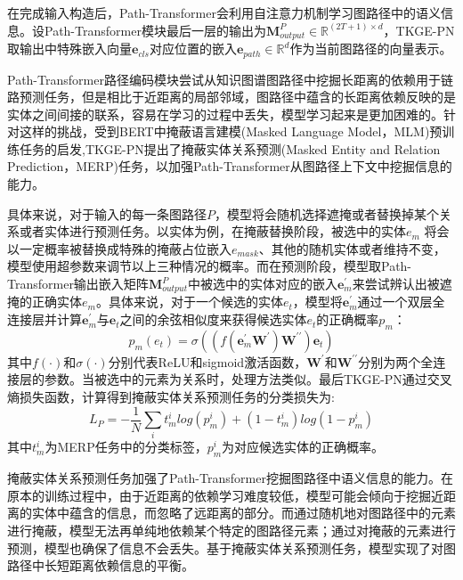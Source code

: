 在完成输入构造后，Path-Transformer会利用自注意力机制学习图路径中的语义信息。设Path-Transformer模块最后一层的输出为$\mathbf{M}_{output}^{P}\in\mathbb{R}^{(2T+1)\times d}$，TKGE-PN取输出中特殊嵌入向量$\boldsymbol{e}_{cls}$对应位置的嵌入$\boldsymbol{e}_{path}\in\mathbb{R}^d$作为当前图路径的向量表示。

Path-Transformer路径编码模块尝试从知识图谱图路径中挖掘长距离的依赖用于链路预测任务，但是相比于近距离的局部邻域，图路径中蕴含的长距离依赖反映的是实体之间间接的联系，容易在学习的过程中丢失，模型学习起来是更加困难的。针对这样的挑战，受到BERT中掩蔽语言建模(Masked Language Model，MLM)预训练任务的启发,TKGE-PN提出了掩蔽实体关系预测(Masked Entity and Relation Prediction，MERP)任务，以加强Path-Transformer从图路径上下文中挖掘信息的能力。

具体来说，对于输入的每一条图路径$P$，模型将会随机选择遮掩或者替换掉某个关系或者实体进行预测任务。以实体为例，在掩蔽替换阶段，被选中的实体$e_m$ 将会以一定概率被替换成特殊的掩蔽占位嵌入$e_{mask}$、其他的随机实体或者维持不变，模型使用超参数来调节以上三种情况的概率。而在预测阶段，模型取Path-Transformer输出嵌入矩阵$\mathbf{M}_{output}^{P}$中被选中的实体对应的嵌入$\boldsymbol{e}_{m}^\prime$来尝试辨认出被遮掩的正确实体$e_m$。具体来说，对于一个候选的实体$e_t$，模型将$\boldsymbol{e}_{m}^\prime$通过一个双层全连接层并计算$\boldsymbol{e}_{m}^\prime$与$\boldsymbol{e}_{t}$之间的余弦相似度来获得候选实体$e_t$的正确概率$p_m$：
\begin{equation}
  p_m(e_t)=\sigma((f(\boldsymbol{e}_m^\prime\mathbf{W}^{\prime})\mathbf{W}^{\prime\prime})\boldsymbol{e}_t)
\end{equation}
其中$f (\cdot)$和$\sigma(\cdot)$分别代表ReLU和sigmoid激活函数，$\mathbf{W}^{\prime}$和$\mathbf{W}^{\prime\prime}$分别为两个全连接层的参数。当被选中的元素为关系时，处理方法类似。最后TKGE-PN通过交叉熵损失函数，计算得到掩蔽实体关系预测任务的分类损失为:
\begin{equation}
  L_{P} = -\frac{1}{N}\sum\limits_{i}t_m^ilog(p_m^i)+(1-t_m^i)log(1-p_m^i)
\end{equation}
其中$t_m^i$为MERP任务中的分类标签，$p_m^i$为对应候选实体的正确概率。

掩蔽实体关系预测任务加强了Path-Transformer挖掘图路径中语义信息的能力。在原本的训练过程中，由于近距离的依赖学习难度较低，模型可能会倾向于挖掘近距离的实体中蕴含的信息，而忽略了远距离的部分。而通过随机地对图路径中的元素进行掩蔽，模型无法再单纯地依赖某个特定的图路径元素；通过对掩蔽的元素进行预测，模型也确保了信息不会丢失。基于掩蔽实体关系预测任务，模型实现了对图路径中长短距离依赖信息的平衡。

